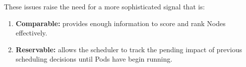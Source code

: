 These issues raise the need for a more sophisticated signal that is:
\begin{enumerate}
    \item \textbf{Comparable:} provides enough information to score and rank
        Nodes effectively.
    \item \textbf{Reservable:} allows the scheduler to track the pending impact
        of previous scheduling decisions until Pods have begin running.
\end{enumerate}

%
%
%

